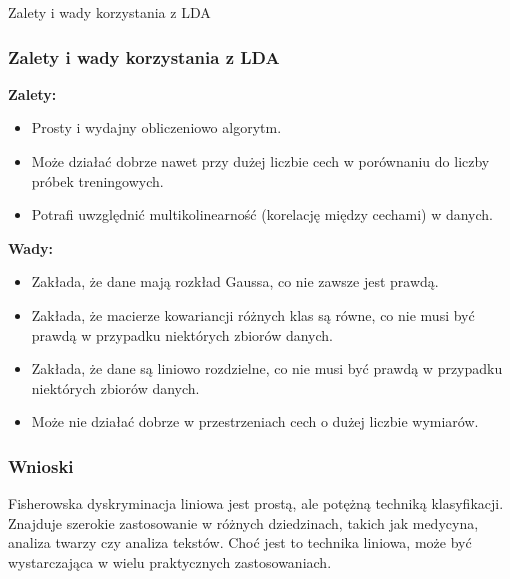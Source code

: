 \documentclass{beamer}
\begin{document}
\begin{frame}{Zalety i wady korzystania z LDA}
    \frametitle{Zalety i wady korzystania z LDA}
    
    \textbf{Zalety:}
    \begin{itemize}
        \item Prosty i wydajny obliczeniowo algorytm.
        \item Może działać dobrze nawet przy dużej liczbie cech w porównaniu do liczby próbek treningowych.
        \item Potrafi uwzględnić multikolinearność (korelację między cechami) w danych.
    \end{itemize}
    
    \bigskip
    
    \textbf{Wady:}
    \begin{itemize}
        \item Zakłada, że dane mają rozkład Gaussa, co nie zawsze jest prawdą.
        \item Zakłada, że macierze kowariancji różnych klas są równe, co nie musi być prawdą w przypadku niektórych zbiorów danych.
        \item Zakłada, że dane są liniowo rozdzielne, co nie musi być prawdą w przypadku niektórych zbiorów danych.
        \item Może nie działać dobrze w przestrzeniach cech o dużej liczbie wymiarów.
    \end{itemize}
\end{frame}


\begin{frame}
    \frametitle{Wnioski}
    Fisherowska dyskryminacja liniowa jest prostą, ale potężną techniką klasyfikacji. Znajduje szerokie zastosowanie w różnych dziedzinach, takich jak medycyna, analiza twarzy czy analiza tekstów. Choć jest to technika liniowa, może być wystarczająca w wielu praktycznych zastosowaniach.
\end{frame}
\end{document}
